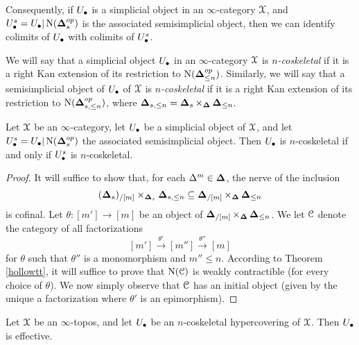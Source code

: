 Consequently, if $U_{\bullet}$ is a simplicial object in an $\infty$-category $\operatorname{\mathcal{X}}$, and $U_{\bullet}^{s} = U_{\bullet} | \operatorname{N}(\operatorname{{\bf \Delta}}^{op}_{s})$ is the associated semisimplicial object, then we can identify colimits of $U_{\bullet}$ with colimits of $U_{\bullet}^{s}$.

We will say that a simplicial object $U_{\bullet}$ in an $\infty$-category
$\operatorname{\mathcal{X}}$ is {\it $n$-coskeletal} if it is a right Kan extension of its restriction to
$\operatorname{N}(\operatorname{{\bf \Delta}}^{op}_{\leq n})$. Similarly, we will say that a semisimplicial
object of $U_{\bullet}$ of $\operatorname{\mathcal{X}}$ is {\it $n$-coskeletal} if it is a right Kan extension
of its restriction to $\operatorname{N}(\operatorname{{\bf \Delta}}^{op}_{s,\leq n})$, where
$\operatorname{{\bf \Delta}}_{s,\leq n} = \operatorname{{\bf \Delta}}_{s} \times_{\operatorname{{\bf \Delta}}} \operatorname{{\bf \Delta}}_{\leq n}$.

\begin{lemma}\label{bball5}
Let $\operatorname{\mathcal{X}}$ be an $\infty$-category, let $U_{\bullet}$ be a simplicial object of $\operatorname{\mathcal{X}}$, and let $U^{s}_{\bullet} = U_{\bullet} | \operatorname{N}(\operatorname{{\bf \Delta}}_{s}^{op})$ the associated semisimplicial object. Then $U_{\bullet}$ is $n$-coskeletal if and only if $U^{s}_{\bullet}$ is $n$-coskeletal.
\end{lemma}

\begin{proof}
It will suffice to show that, for each $\Delta^m \in \operatorname{{\bf \Delta}}$, the nerve of the inclusion
$$ (\operatorname{{\bf \Delta}}_{s})_{/[m]} \times_{ \operatorname{{\bf \Delta}}_{s} } \operatorname{{\bf \Delta}}_{s, \leq n} \subseteq 
\operatorname{{\bf \Delta}}_{ / [m] } \times_{\operatorname{{\bf \Delta}}} \operatorname{{\bf \Delta}}_{\leq n}$$
is cofinal. Let $\theta: [m'] \rightarrow [m]$ be an object of 
$\operatorname{{\bf \Delta}}_{ / [m] } \times_{\operatorname{{\bf \Delta}}} \operatorname{{\bf \Delta}}_{\leq n}$. We let
$\operatorname{\mathcal{C}}$ denote the category of all factorizations 
$$ [m'] \stackrel{\theta'}{\rightarrow} [m''] \stackrel{\theta''}{\rightarrow} [m]$$
for $\theta$ such that $\theta''$ is a monomorphism and $m'' \leq n$. According to Theorem \ref{hollowtt}, it will suffice to prove that $\operatorname{N}(\operatorname{\mathcal{C}})$ is weakly contractible (for every choice of $\theta$). We now
simply observe that $\operatorname{\mathcal{C}}$ has an initial object (given by the unique a factorization where
$\theta'$ is an epimorphism). 
\end{proof}

\begin{lemma}\label{bball1}
Let $\operatorname{\mathcal{X}}$ be an $\infty$-topos, and let $U_{\bullet}$ be an $n$-coskeletal hypercovering of $\operatorname{\mathcal{X}}$. Then $U_{\bullet}$ is effective.
\end{lemma}

